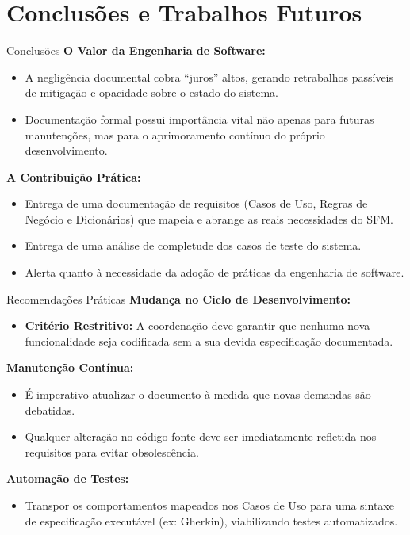 \section{Conclusões e Trabalhos Futuros}

\begin{frame}{Conclusões}
  \textbf{O Valor da Engenharia de Software:}
  \begin{itemize}
    \item A negligência documental cobra ``juros'' altos, gerando retrabalhos passíveis de mitigação e opacidade sobre o estado do sistema.
    \item Documentação formal possui importância vital não apenas para futuras manutenções, mas para o aprimoramento contínuo do próprio desenvolvimento.
  \end{itemize}
  
  \vspace{1em}
  
  \textbf{A Contribuição Prática:}
  \begin{itemize}
    \item Entrega de uma documentação de requisitos (Casos de Uso, Regras de Negócio e Dicionários) que mapeia e abrange as reais necessidades do SFM.
    \item Entrega de uma análise de completude dos casos de teste do sistema.
    \item Alerta quanto à necessidade da adoção de práticas da engenharia de software.
  \end{itemize}
\end{frame}

\begin{frame}{Recomendações Práticas}
  \textbf{Mudança no Ciclo de Desenvolvimento:}
  \begin{itemize}
    \item \textbf{Critério Restritivo:} A coordenação deve garantir que nenhuma nova funcionalidade seja codificada sem a sua devida especificação documentada.
  \end{itemize}

  \vspace{1.0em}

  \textbf{Manutenção Contínua:}
  \begin{itemize}
    \item É imperativo atualizar o documento à medida que novas demandas são debatidas.
    \item Qualquer alteração no código-fonte deve ser imediatamente refletida nos requisitos para evitar obsolescência.
  \end{itemize}

  \vspace{1.0em}

  \textbf{Automação de Testes:} 
  \begin{itemize}
      \item Transpor os comportamentos mapeados nos Casos de Uso para uma sintaxe de especificação executável (ex: Gherkin), viabilizando testes automatizados.
  \end{itemize}
\end{frame}

